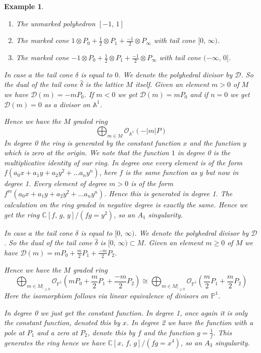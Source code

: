 \documentclass[12pt,a4paper]{book}      %
\newtheorem{ex}[thm]{Example}
\begin{document}
\begin{ex}
\begin{enumerate}[label =\alph*)]
\item The unmarked polyhedron $[-1, \, 1]$
\item The marked cone $1\otimes P_0 + \frac{1}{2} \otimes P_1 + \frac{-1}{2} \otimes P_\infty$ with tail cone $[0,\, \infty)$.
\item The marked cone $-1\otimes P_0 + \frac{1}{2} \otimes P_1 + \frac{-1}{2} \otimes P_\infty$ with tail cone $(-\infty, \, 0]$.
\end{enumerate}

In case $a$ the tail cone $\delta$ is equal to $0$. We denote the polyhedral divisor by $\mathcal{D}$. So the dual of the tail cone $\hat{\delta}$ is the lattice $M$ itself. Given an element $ m >0$ of $M$ we have $\mathcal{D}(m) = -mP_0$. If $m <0$ we get $\mathcal{D}(m) = mP_0$ and if $n=0$ we get $\mathcal{D}(m) = 0$ as a divisor on $\mathbb{A}^1$. 

Hence we have the $M$ graded ring
\[
\bigoplus_{m \in M} \mathcal{O}_{\mathbb{A}^1}(-|m|P)
\]
In degree 0 the ring is generated by the constant function $x$ and the function $y$ which is zero at the origin. We note that the function $1$ in degree 0 is the multiplicative identity of our ring. In degree one every element is of the form $f ( a_0 x + a_1 y + a_2 y^2 + \dots  a_n y^n)$, here $f$ is the same function as $y$ but now in degree 1. Every element of degree $m>0$ is of the form $f^m ( a_0 x + a_1 y + a_2 y^2 + \dots  a_n y^n)$. Hence this is generated in degree 1. The calculation on the ring graded in negative degree is exactly the same.  Hence we get the ring $\mathbb{C}[f,  \, g, \, y]/ (fg=y^2)$, so an $A_1$ singularity.


In case $a$ the tail cone $\delta$ is equal to $[0 ,  \, \infty)$. We denote the polyhedral divisor by $\mathcal{D}$. So the dual of the tail cone $\hat{\delta}$ is $[0 ,  \, \infty) \subset M$. Given an element $ m \geq 0$ of $M$ we have $\mathcal{D}(m) = mP_0 +\frac{m}{2} P_1 + \frac{-m}{2}P_2$. 

Hence we have the $M$ graded ring
\[
\bigoplus_{m \in M|_{\geq 0}} \mathcal{O}_{\mathbb{P}^1} \left(mP_0 +\frac{m}{2} P_1 + \frac{-m}{2}P_2 \right) \cong \bigoplus_{m \in M|_{\geq 0}} \mathcal{O}_{\mathbb{P}^1} \left(\frac{m}{2} P_1 + \frac{m}{2}P_2 \right)
\]
Here the isomorphism follows via linear equivalence of divisors on $\mathbb{P}^1$.

In degree 0 we just get the constant function. In degree 1, once again it is only the constant function, denoted this by $x$. In degree 2 we have the function with a pole at $P_1$ and a zero at $P_2$, denote this by $f$ and the function $g = \frac{1}{f}$. This generates the ring hence we have $\mathbb{C}[x, \, f, \, g]/(fg = x^4)$, so an $A_3$ singularity.



\end{ex}
\end{document}
